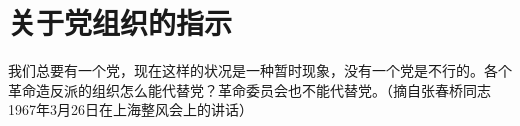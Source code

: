 \section[关于党组织的指示（一九六七年三月）]{关于党组织的指示}


我们总要有一个党，现在这样的状况是一种暂时现象，没有一个党是不行的。各个革命造反派的组织怎么能代替党？革命委员会也不能代替党。（摘自张春桥同志1967年3月26日在上海整风会上的讲话）


